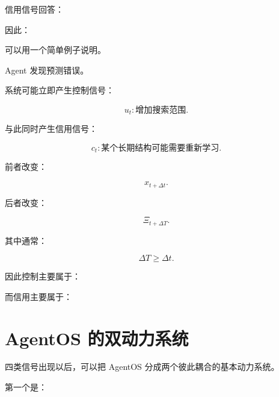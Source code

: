 信用信号回答：

\begin{statementbox}
\centering
{}
\end{statementbox}

因此：

\begin{statementbox}
\centering
{}
\end{statementbox}

可以用一个简单例子说明。

Agent 发现预测错误。

系统可能立即产生控制信号：

\[
u_t:
\text{增加搜索范围}.
\]

与此同时产生信用信号：

\[
c_t:
\text{某个长期结构可能需要重新学习}.
\]

前者改变：

\[
x_{t+\Delta t}.
\]

后者改变：

\[
\Xi_{t+\Delta T}.
\]

其中通常：

\[
\Delta T
\ge
\Delta t.
\]

因此控制主要属于：

\begin{statementbox}
\centering
{}
\end{statementbox}

而信用主要属于：

\begin{statementbox}
\centering
{}
\end{statementbox}

\section{AgentOS 的双动力系统}

四类信号出现以后，可以把 AgentOS 分成两个彼此耦合的基本动力系统。

第一个是：

\begin{statementbox}
\centering
{}
\end{statementbox}

